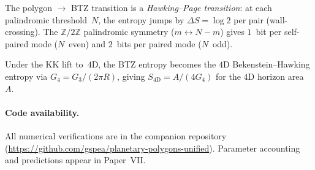 The polygon $\to$ BTZ transition is a \emph{Hawking--Page transition}:
at each palindromic threshold~$N$, the entropy jumps by
$\Delta S = \log 2$ per pair (wall-crossing).
The $\mathbb{Z}/2\mathbb{Z}$ palindromic symmetry ($m \leftrightarrow N{-}m$)
gives $1$~bit per self-paired mode ($N$~even) and $2$~bits per paired
mode ($N$~odd).

Under the KK lift to~$4$D, the BTZ entropy becomes the $4$D
Bekenstein--Hawking entropy via $G_4 = G_3/(2\pi R)$, giving
$S_{4\mathrm{D}} = A/(4G_4)$ for the $4$D horizon area~$A$.





\paragraph{Code availability.}
All numerical verifications are in the companion repository
(\url{https://github.com/gspea/planetary-polygons-unified}).
Parameter accounting and predictions appear in Paper~VII.





